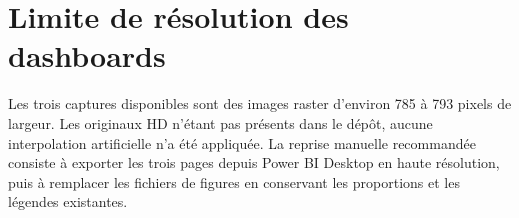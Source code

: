 \section{Limite de résolution des dashboards}
Les trois captures disponibles sont des images raster d'environ 785 à 793 pixels de largeur. Les originaux HD n'étant pas présents dans le dépôt, aucune interpolation artificielle n'a été appliquée. La reprise manuelle recommandée consiste à exporter les trois pages depuis Power BI Desktop en haute résolution, puis à remplacer les fichiers de figures en conservant les proportions et les légendes existantes.
